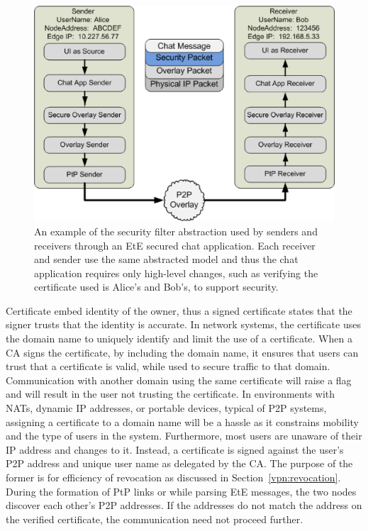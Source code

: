 \begin{figure}
\centering
\includegraphics[width=6in]{figs/secure_sender_stack_generic.png.eps}
\caption[Security filter]{An example of the security filter abstraction used by
senders and receivers through an EtE secured chat application.  Each receiver
and sender use the same abstracted model and thus the chat application requires
only high-level changes, such as verifying the certificate used is Alice's and
Bob's, to support security.}
\label{fig:security_filter}
\end{figure}

Certificate embed identity of the owner, thus a signed certificate states that
the signer trusts that the identity is accurate.  In network systems, the
certificate uses the domain name to uniquely identify and limit the use of a
certificate.  When a CA signs the certificate, by including the domain name, it
ensures that users can trust that a certificate is valid, while used to secure
traffic to that domain.  Communication with another domain using the same
certificate will raise a flag and will result in the user not trusting the
certificate.  In environments with NATs, dynamic IP addresses, or portable
devices, typical of P2P systems, assigning a certificate to a domain name will
be a hassle as it constrains mobility and the type of users in the system.
Furthermore, most users are unaware of their IP address and changes to it.
Instead, a certificate is signed against the user's P2P address and unique user
name as delegated by the CA.  The purpose of the former is for efficiency of
revocation as discussed in Section~\ref{vpn:revocation}.  During the formation
of PtP links or while parsing EtE messages, the two nodes discover each other's
P2P addresses.  If the addresses do not match the address on the verified
certificate, the communication need not proceed further.  

